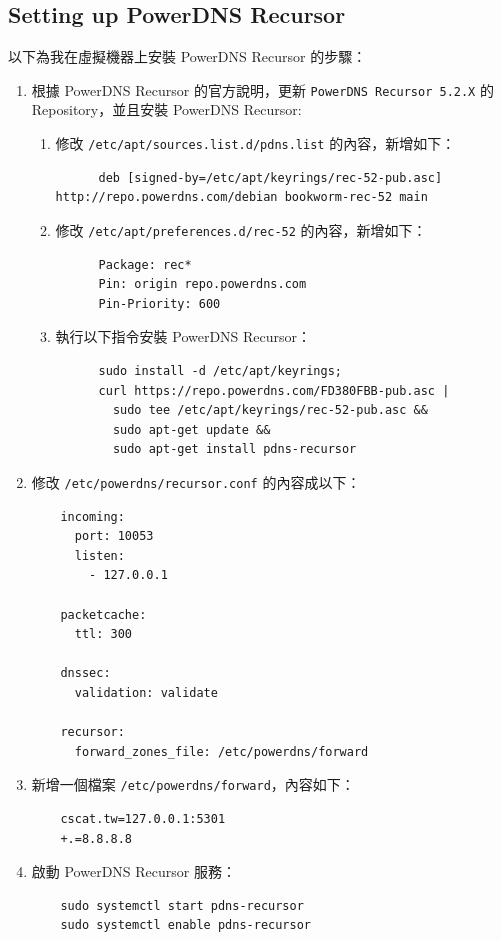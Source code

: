 \documentclass[12pt]{article}
\newenvironment{problem}[2][Problem]{\begin{trivlist}
\item[\hskip \labelsep {\bfseries #1}\hskip \labelsep {\bfseries #2}]}{\end{trivlist}}
\begin{document}
\subsection{Setting up PowerDNS Recursor}
\begin{problem}{2.1.1} 以下為我在虛擬機器上安裝 PowerDNS Recursor 的步驟：
  \begin{enumerate}
    \item 根據 PowerDNS Recursor 的官方說明，更新 \texttt{PowerDNS Recursor 5.2.X} 的 Repository，並且安裝 PowerDNS Recursor:
      \begin{enumerate}
        \item 修改 \texttt{/etc/apt/sources.list.d/pdns.list} 的內容，新增如下：
    \begin{verbatim}
      deb [signed-by=/etc/apt/keyrings/rec-52-pub.asc] http://repo.powerdns.com/debian bookworm-rec-52 main
    \end{verbatim}
        \item 修改 \texttt{/etc/apt/preferences.d/rec-52} 的內容，新增如下：
    \begin{verbatim}
      Package: rec*
      Pin: origin repo.powerdns.com
      Pin-Priority: 600
    \end{verbatim}
        \item 執行以下指令安裝 PowerDNS Recursor：
    \begin{verbatim}
      sudo install -d /etc/apt/keyrings;
      curl https://repo.powerdns.com/FD380FBB-pub.asc |
        sudo tee /etc/apt/keyrings/rec-52-pub.asc &&
        sudo apt-get update &&
        sudo apt-get install pdns-recursor
    \end{verbatim}
      \end{enumerate}
    \item 修改 \texttt{/etc/powerdns/recursor.conf} 的內容成以下：
  \begin{verbatim}
    incoming:
      port: 10053
      listen:
        - 127.0.0.1

    packetcache:
      ttl: 300

    dnssec:
      validation: validate

    recursor:
      forward_zones_file: /etc/powerdns/forward
  \end{verbatim}
    \item 新增一個檔案 \texttt{/etc/powerdns/forward}，內容如下：
  \begin{verbatim}
    cscat.tw=127.0.0.1:5301
    +.=8.8.8.8
  \end{verbatim}
    \item 啟動 PowerDNS Recursor 服務：
  \begin{verbatim}
    sudo systemctl start pdns-recursor
    sudo systemctl enable pdns-recursor
  \end{verbatim}
  \end{enumerate}
\end{problem}
\end{document}
